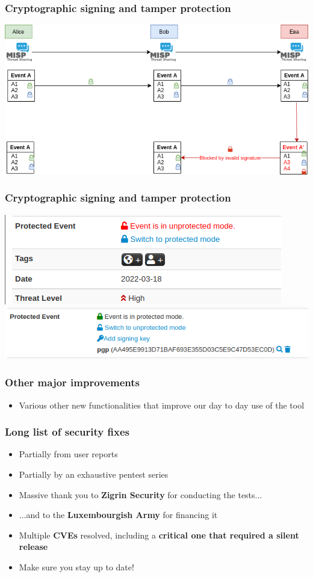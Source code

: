 \begin{frame}
\frametitle{Cryptographic signing and tamper protection}
\includegraphics[scale=0.5]{images/signing2.png}
\end{frame}

\begin{frame}
\frametitle{Cryptographic signing and tamper protection}
\includegraphics[scale=0.6]{images/signing3.png}
\includegraphics[scale=0.6]{images/signing4.png}
\end{frame}

\begin{frame}
  \frametitle{Other major improvements}
  \begin{itemize}
      \item Various other new functionalities that improve our day to day use of the tool
  \end{itemize}
\end{frame}

\begin{frame}
  \frametitle{Long list of security fixes}
  \begin{itemize}
      \item Partially from user reports
      \item Partially by an exhaustive pentest series
      \item Massive thank you to {\bf Zigrin Security} for conducting the tests...
      \item ...and to the {\bf Luxembourgish Army} for financing it
      \item Multiple {\bf CVEs} resolved, including a {\bf critical one that required a silent release}
      \item Make sure you stay up to date!
  \end{itemize}
\end{frame}

